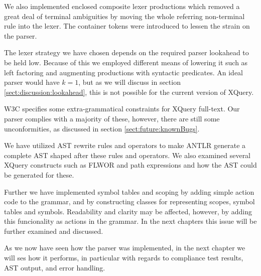 We also implemented enclosed composite lexer productions which removed a great
deal of terminal ambiguities by moving the whole referring non-terminal rule
into the lexer. The container tokens were introduced to lessen the strain on
the parser.

The lexer strategy we have chosen depends on the required parser lookahead to
be held low. Because of this we employed different means of lowering it such as
left factoring and augmenting productions with syntactic predicates. An ideal
parser would have $k=1$, but as we will discuss in section
\ref{sect:discussion:lookahead}, this is not possible for the current version
of XQuery.

W3C specifies some extra-grammatical constraints for XQuery full-text. Our parser
complies with a majority of these, however, there are still some
unconformities, as discussed in section \ref{sect:future:knownBugs}.  

We have utilized AST rewrite rules and operators to make
ANTLR generate a complete AST shaped after these rules and operators. We also
examined several XQuery constructs such as FLWOR and path expressions and how
the AST could be generated for these.

Further we have implemented symbol tables and scoping by adding simple action
code to the grammar, and by constructing classes for representing scopes, symbol
tables and symbols. Readability and clarity may be affected, however, by adding this funcionality as actions in the grammar. In the next chapters this issue will be further examined and discussed.

As we now have seen how the parser was implemented, in the next chapter we will
ses how it performs, in particular with regards to compliance test results, AST
output, and error handling.